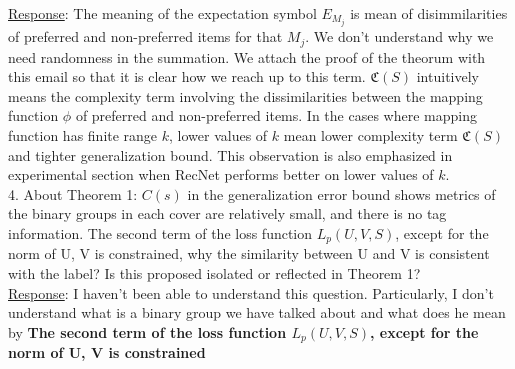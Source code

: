 \documentclass{article}
\begin{document}
\underline{Response}: The meaning of the expectation symbol $E_{M_j}$ is mean of disimmilarities of preferred and non-preferred items for that $M_j$. We don't understand why we need randomness in the summation. We attach the proof of the theorum with this email so that it is clear how we reach up to this term. $\mathfrak{C}(S)$ intuitively means the complexity term involving the dissimilarities between the mapping function $\phi$ of preferred and non-preferred items.
In the cases where mapping function has finite range $k$, lower values of $k$  mean lower complexity term $\mathfrak{C}(S)$ and tighter generalization bound. This observation is also emphasized in experimental section when RecNet performs better on lower values of $k$.\\

4. About Theorem 1: $C(s)$ in the generalization error bound shows metrics of the binary groups in each cover are relatively small, and there is no tag information. The second term of the loss function $L_p(U,V,S)$, except for the norm of U, V is constrained, why the similarity between U and V is consistent with the label? Is this proposed isolated or reflected in Theorem 1?\\

\underline{Response}: I haven't been able to understand this question. Particularly, I don't understand what is a binary group we have talked about and what does he mean by  \textbf{The second term of the loss function $L_p(U,V,S)$, except for the norm of U, V is constrained}



\end{document}
